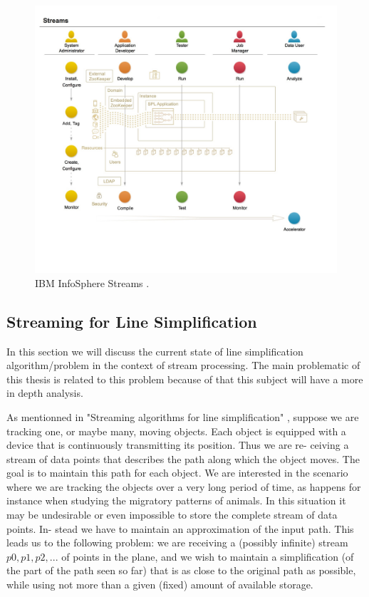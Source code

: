 \documentclass[twoside,12pt, a4paper]{report}
\begin{document}
\begin{figure}[!h]
	\centering
	\includegraphics[width=1\linewidth]{figures/model.jpg}
	\caption{IBM InfoSphere Streams \cite{ibmdoc}.}
	\label{fig:ibm}
\end{figure}


\subsection{Streaming for Line Simplification}
In this section we will discuss the current state of line simplification algorithm/problem in the context of stream processing.
The main problematic of this thesis is related to this problem because of that this subject will have a more in depth analysis.

As mentionned in "Streaming algorithms for line simplification" \cite{abam2007streaming}, suppose we are tracking one, or maybe many,
moving objects. Each object is equipped with a device that
is continuously transmitting its position. Thus we are re-
ceiving a stream of data points that describes the path along
which the object moves. The goal is to maintain this path
for each object. We are interested in the scenario where we
are tracking the objects over a very long period of time, as
happens for instance when studying the migratory patterns
of animals. In this situation it may be undesirable or even
impossible to store the complete stream of data points. In-
stead we have to maintain an approximation of the input
path. This leads us to the following problem: we are receiving a (possibly infinite) stream $p0,p1,p2,...$ of points in
the plane, and we wish to maintain a simplification (of the
part of the path seen so far) that is as close to the original
path as possible, while using not more than a given (fixed)
amount of available storage.
\end{document}
